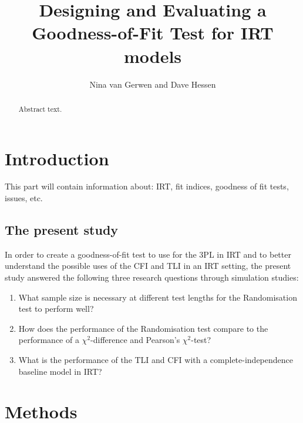 \documentclass[Royal,sageapa,times,doublespace]{sagej}
\begin{document}

\title{Designing and Evaluating a Goodness-of-Fit Test for IRT models}

\author{Nina van Gerwen  and Dave Hessen}




\begin{abstract}
Abstract text.
\end{abstract}


\maketitle

\section{Introduction}
This part will contain information about: IRT, fit indices, goodness of fit tests, issues, etc.
\subsection{The present study}
In order to create a goodness-of-fit test to use for the 3PL in IRT and to better understand the possible uses of the CFI and TLI in an IRT setting, the present study answered the following three research questions through simulation studies:
\begin{enumerate}
\item{What sample size is necessary at different test lengths for the Randomisation test to perform well?}
\item{How does the performance of the Randomisation test compare to the performance of a $\chi^2$-difference and Pearson's $\chi^2$-test?}
\item{What is the performance of the TLI and CFI with a complete-independence baseline model in IRT?}
\end{enumerate}

\section{Methods}
\end{document}
